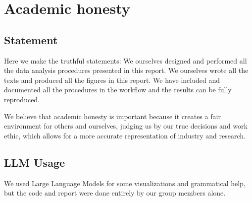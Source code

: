 \documentclass{article}
\begin{document}
\appendix
\section{Academic honesty}

\subsection{Statement}

Here we make the truthful statements: We ourselves designed and performed all the data analysis procedures presented in this report. We ourselves wrote all the texts and produced all the figures in this report. We have included and documented all the procedures in the workflow and the results can be fully reproduced. 

We believe that academic honesty is important because it creates a fair environment for others and ourselves, judging us by our true decisions and work ethic, which allows for a more accurate representation of industry and research.

\subsection{LLM Usage}

We used Large Language Models for some visualizations and grammatical help, but the code and report were done entirely by our group members alone. 


\end{document}

